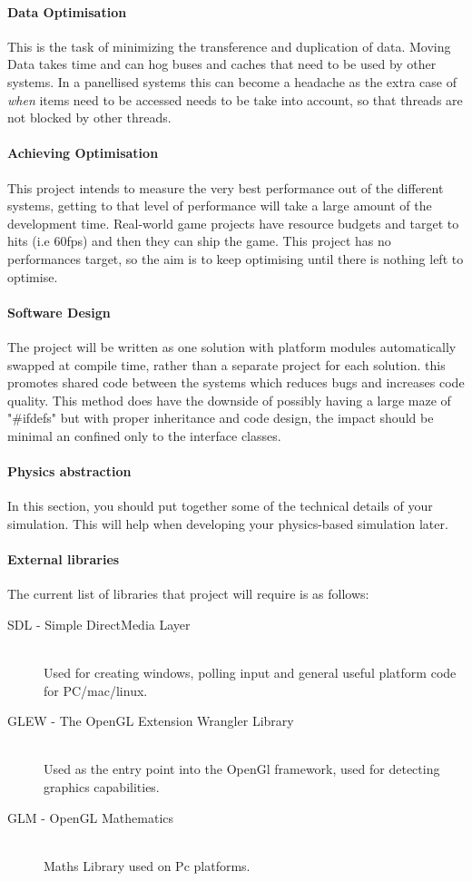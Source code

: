 \documentclass[conference]{acmsiggraph}
\begin{document}
\paragraph{Data Optimisation}
This is the task of minimizing the transference and duplication of data. Moving Data takes time and can hog buses and caches that need to be used by other systems.
In a panellised systems this can become a headache as the extra case of \textit{when} items need to be accessed needs to be take into account, so that threads are not blocked by other threads.

\paragraph{Achieving Optimisation}
This project intends to measure the very best performance out of the different systems, getting to that level of performance will take a large amount of the development time. Real-world game projects have resource budgets and target to hits (i.e 60fps) and then they can ship the game. This project has no performances target, so the aim is to keep optimising until there is nothing left to optimise.

\paragraph{Software Design}
The project will be written as one solution with platform modules automatically swapped at compile time, rather than a separate project for each solution. this promotes shared code between the systems which reduces bugs and increases code quality. This method does have the downside of possibly having a large maze of "\#ifdefs" but with proper inheritance and code design, the impact should be minimal an confined only to the interface classes.

\paragraph{Physics abstraction}

In this section, you should put together some of the technical details of your simulation.  This will help when developing your physics-based simulation later.

\paragraph{External libraries}
The current list of libraries that project will require is as follows:
\begin{description}
  \item[SDL - Simple DirectMedia Layer] \hfill \\
  	Used for creating windows, polling input and general useful platform code for PC/mac/linux.
  \item[GLEW -  The OpenGL Extension Wrangler Library] \hfill \\
  	Used as the entry point into the OpenGl framework, used for detecting graphics capabilities.
  \item[GLM -  OpenGL Mathematics] \hfill \\
  	Maths Library used on Pc platforms.
\end{description}
\end{document}

